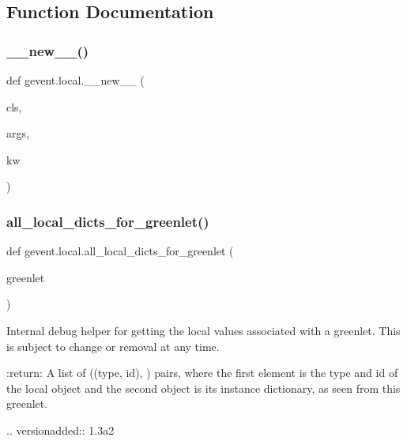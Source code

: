 \subsection{Function Documentation}
\mbox{\label{namespacegevent_1_1local_a7f1cd15dc008b574836a1b7489435fbe}} 
\subsubsection{\texorpdfstring{\+\_\+\+\_\+new\+\_\+\+\_\+()}{\_\_new\_\_()}}
{\footnotesize\ttfamily def gevent.\+local.\+\_\+\+\_\+new\+\_\+\+\_\+ (\begin{DoxyParamCaption}\item[{}]{cls,  }\item[{}]{args,  }\item[{}]{kw }\end{DoxyParamCaption})}

\mbox{\label{namespacegevent_1_1local_a7c64f3274eade7af20a74b11b7fb8406}} 
\subsubsection{\texorpdfstring{all\+\_\+local\+\_\+dicts\+\_\+for\+\_\+greenlet()}{all\_local\_dicts\_for\_greenlet()}}
{\footnotesize\ttfamily def gevent.\+local.\+all\+\_\+local\+\_\+dicts\+\_\+for\+\_\+greenlet (\begin{DoxyParamCaption}\item[{}]{greenlet }\end{DoxyParamCaption})}

\begin{DoxyVerb}Internal debug helper for getting the local values associated
with a greenlet. This is subject to change or removal at any time.

:return: A list of ((type, id), {}) pairs, where the first element
  is the type and id of the local object and the second object is its
  instance dictionary, as seen from this greenlet.

.. versionadded:: 1.3a2
\end{DoxyVerb}
 

